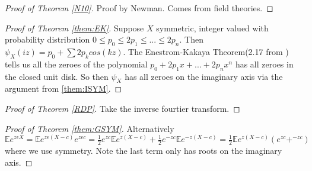 \documentclass[10pt]{article}
\newcommand{\E}{\mathbb{E}}
\newcommand{\1}{\textbf{1}}
\theoremstyle{remark}
\theoremstyle{definition}
\begin{document}
\begin{proof}[Proof of Theorem \ref{N10}]
	Proof by Newman. Comes from field theories.
\end{proof}


\begin{proof}[Proof of Theorem \ref{them:EK}]
	Suppose $X$ symmetric, integer valued with probability distribution $0 \leq p_0 \leq 2p_1 \leq ... \leq 2p_n$. Then $\psi_X(iz) = p_0 + \sum 2p_k cos(kz)$. The Enestrom-Kakaya Theorem(2.17 from \cite{HP}) tells us all the zeroes of the polynomial $p_0 +2p_1x+...+2p_nx^n$ has all zeroes in the closed unit disk. So then $\psi_X$ has all zeroes on the imaginary axis via the argument from \ref{them:ISYM}.
\end{proof}

\begin{proof}[Proof of Theorem \ref{RDP}]
	Take the inverse fourtier transform.
\end{proof}

\begin{proof}[Proof of Theorem \ref{them:GSYM}]

	Alternatively $\E e^{z \epsilon X} = \E e^{z\epsilon (X-c)}e^{z\epsilon c} = \frac{1}{2}e^{zc}\E e^{z(X-c)}+\frac{1}{2}e^{-zc}\E e^{-z(X-c)} = \frac{1}{2}\E e^{z(X-c)}(e^{zc}+^{-zc})$ where we use symmetry. Note the last term only has roots on the imaginary axis.
\end{proof}


\begin{thebibliography}{9}


\end{thebibliography}
\end{document}
